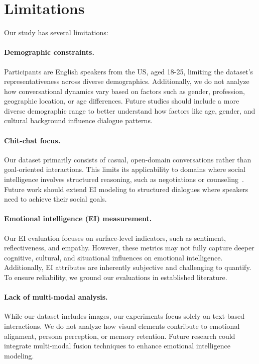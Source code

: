 \section{Limitations}  
Our study has several limitations:  

\paragraph{Demographic constraints.}  
Participants are English speakers from the US, aged 18-25, limiting the dataset’s representativeness across diverse demographics.  
Additionally, we do not analyze how conversational dynamics vary based on factors such as gender, profession, geographic location, or age differences.  
Future studies should include a more diverse demographic range to better understand how factors like age, gender, and cultural background influence dialogue patterns.

\paragraph{Chit-chat focus.}  
Our dataset primarily consists of casual, open-domain conversations rather than goal-oriented interactions.  
This limits its applicability to domains where social intelligence involves structured reasoning, such as negotiations or counseling~\cite{zhou2023sotopia, wu2024longmemeval, liu-etal-2024-interintent}.  
Future work should extend EI modeling to structured dialogues where speakers need to achieve their social goals.  

\paragraph{Emotional intelligence (EI) measurement.}  
Our EI evaluation focuses on surface-level indicators, such as sentiment, reflectiveness, and empathy.  
However, these metrics may not fully capture deeper cognitive, cultural, and situational influences on emotional intelligence.  
Additionally, EI attributes are inherently subjective and challenging to quantify.  
To ensure reliability, we ground our evaluations in established literature.  

\paragraph{Lack of multi-modal analysis.}  
While our dataset includes images, our experiments focus solely on text-based interactions.  
We do not analyze how visual elements contribute to emotional alignment, persona perception, or memory retention.  
Future research could integrate multi-modal fusion techniques to enhance emotional intelligence modeling.  

